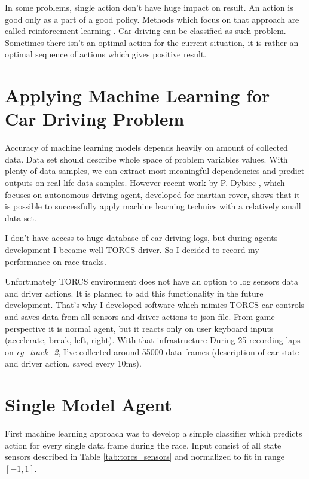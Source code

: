 \documentclass[declaration,shortabstract,english,inz]{iithesis}
\begin{document}
In some problems, single action don't have huge impact on result.
An action is good only as a part of a good policy.
Methods which focus on that approach are called reinforcement learning \cite{Introduction_ML}.
Car driving can be classified as such problem.
Sometimes there isn't an optimal action for the current situation, it is rather an optimal sequence of actions which gives positive result.


\section{Applying Machine Learning for Car Driving Problem}

Accuracy of machine learning models depends heavily on amount of collected data.
Data set should describe whole space of problem variables values.
With plenty of data samples, we can extract most meaningful dependencies and predict outputs on real life data samples.
However recent work by P. Dybiec \cite{rover}, which focuses on autonomous driving agent, developed for martian rover, shows that it is possible to successfully apply machine learning technics with a relatively small data set.

  
I don't have access to huge database of car driving logs, but during agents development I became well TORCS driver.
So I decided to record my performance on race tracks.

Unfortunately TORCS environment does not have an option to log sensors data and driver actions.
It is planned to add this functionality in the future development.
That's why I developed software which mimics TORCS car controls and saves data from all sensors and driver actions to json file.
From game perspective it is normal agent, but it reacts only on user keyboard inputs (accelerate, break, left, right).
 With that infrastructure During 25 recording laps on \textit{cg\_track\_2}, I've collected around 55000 data frames (description of car state and driver action, saved every 10ms).

\section{Single Model Agent}



First machine learning approach was to develop a simple classifier which predicts action for every single data frame during the race.
Input consist of all state sensors described  in Table \ref{tab:torcs_sensors} and normalized to fit in range $[-1,1]$.
\end{document}
